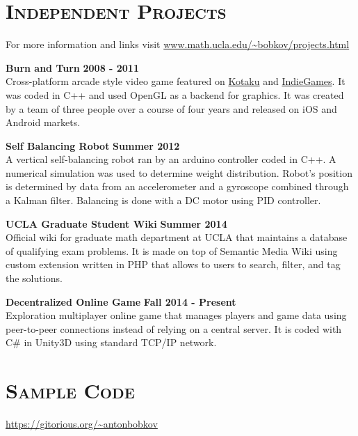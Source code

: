 \documentclass[margin, 10pt]{res} %
\begin{document}
\begin{resume}
 
\section{\textsc{Independent Projects}}
For more information and links visit \url{www.math.ucla.edu/~bobkov/projects.html}

\textbf{Burn and Turn} \hfill \textbf{2008 - 2011}\\
Cross-platform arcade style video game featured on \href{http://kotaku.com/5862197/burn-and-turn-combines-retro-arcade-stylings-with-tower-defense-for-combustible-fun}{Kotaku} and \href{http://indiegames.com/2011/10/trailer_burn_turn_robot_bear.html}{IndieGames}. It was coded in C++ and used OpenGL as a backend for graphics. It was created by a team of three people over a course of four years and released on iOS and Android markets.

\textbf{Self Balancing Robot} \hfill \textbf{Summer 2012}\\
A vertical self-balancing robot ran by an arduino controller coded in C++. A numerical simulation was used to determine weight distribution. Robot's position is determined by data from an accelerometer and a gyroscope combined through a Kalman filter. Balancing is done with a DC motor using PID controller.

\textbf{UCLA Graduate Student Wiki} \hfill \textbf{Summer 2014}\\
Official wiki for graduate math department at UCLA that maintains a database of qualifying exam problems. It is made on top of Semantic Media Wiki using custom extension written in PHP that allows to users to search, filter, and tag the solutions.

\textbf{Decentralized Online Game} \hfill \textbf{Fall 2014 - Present}\\
Exploration multiplayer online game that manages players and game data using peer-to-peer connections instead of relying on a central server. It is coded with C\# in Unity3D using standard TCP/IP network.

\section{\textsc{Sample Code}}
\url{https://gitorious.org/~antonbobkov}

\end{resume}
\end{document}
